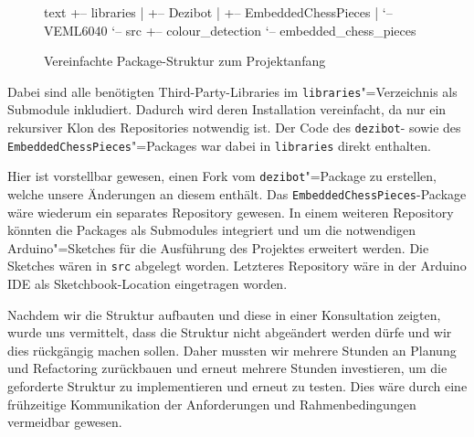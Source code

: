 \begin{figure}[h]
\centering
\begin{cminted}{text}
    +-- libraries
    |   +-- Dezibot
    |   +-- EmbeddedChessPieces
    |   `-- VEML6040
    `-- src
        +-- colour_detection
        `-- embedded_chess_pieces
\end{cminted}
\caption{Vereinfachte Package-Struktur zum Projektanfang}
\label{fig:project-structure}
\end{figure}

Dabei sind alle benötigten Third-Party-Libraries im \texttt{libraries}"=Verzeichnis als Submodule inkludiert. Dadurch wird deren Installation vereinfacht, da nur ein rekursiver Klon des Repositories notwendig ist. Der Code des \texttt{dezibot}- sowie des \texttt{EmbeddedChessPieces}"=Packages war dabei in \texttt{libraries} direkt enthalten.

Hier ist vorstellbar gewesen, einen Fork vom \texttt{dezibot}"=Package zu erstellen, welche unsere Änderungen an diesem enthält. Das \texttt{EmbeddedChessPieces}-Package wäre wiederum ein separates Repository gewesen. In einem weiteren Repository könnten die Packages als Submodules integriert und um die notwendigen Arduino"=Sketches für die Ausführung des Projektes erweitert werden. Die Sketches wären in \texttt{src} abgelegt worden. Letzteres Repository wäre in der Arduino IDE als Sketchbook-Location eingetragen worden.

Nachdem wir die Struktur aufbauten und diese in einer Konsultation zeigten, wurde uns vermittelt, dass die Struktur nicht abgeändert werden dürfe und wir dies rückgängig machen sollen. Daher mussten wir mehrere Stunden an Planung und Refactoring zurückbauen und erneut mehrere Stunden investieren, um die geforderte Struktur zu implementieren und erneut zu testen. Dies wäre durch eine frühzeitige Kommunikation der Anforderungen und Rahmenbedingungen vermeidbar gewesen.
